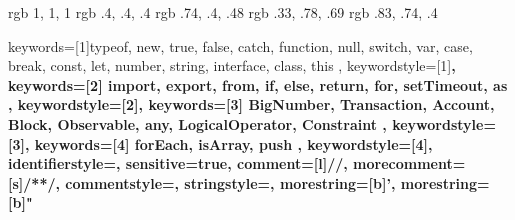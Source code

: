 \usepackage[italian]{babel}
\usepackage[usenames]{color}

\usepackage{hyperref}
\hypersetup{
    colorlinks,
    citecolor=black,
    filecolor=black,
    linkcolor=blue,
    urlcolor=blue
}

\usepackage{listings}
\usepackage{makeidx}
\usepackage[a4paper,top=2cm,bottom=2.2cm,left=2.5cm,right=2.5cm]{geometry}
\usepackage{float}
\usepackage{color}
	\definecolor{lightgray} {rgb} { 1, 1, 1 }
	\definecolor{darkgray} {rgb} { .4, .4, .4 }
  \definecolor{purple} {rgb} { .74, .4, .48 }
  \definecolor{green} {rgb} { .33, .78, .69 }
  \definecolor{yellow} {rgb} { .83, .74, .4 }

 {
  keywords=[1]{typeof, new, true, false, catch, function, null, switch, var, case, break, const, let, number, string, interface, class, this },
  keywordstyle=[1]\color{blue}\bfseries,
  keywords=[2]{ import, export, from, if, else, return, for, setTimeout, as },
  keywordstyle=[2]\color{purple}\bfseries,
  keywords=[3]{ BigNumber, Transaction, Account, Block, Observable, any, LogicalOperator, Constraint },
  keywordstyle=[3]\color{green}\bfseries,
  keywords=[4]{ forEach, isArray, push },
  keywordstyle=[4]\color{yellow}\bfseries,
  identifierstyle=\color{black},
  sensitive=true,
  comment=[l]{//},
  morecomment=[s]{/*}{*/},
  commentstyle=\color{purple}\ttfamily,
  stringstyle=\color{red}\ttfamily,
  morestring=[b]',
  morestring=[b]"
}

\usepackage{graphicx}
\graphicspath{ {Images/} }
